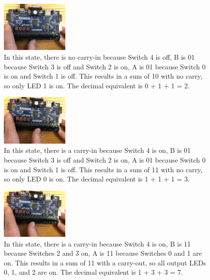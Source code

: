 \documentclass[11pt]{article}
\begin{document}
\begin{figure}[H]
\begin{center}
	\includegraphics[width=0.3\textwidth]{./report-images/Part1/IMG_3034.jpg}
	\caption{\label{fig:SlicerOnePlusOne}In this state, there is no carry-in because Switch 4 is off, B is 01 because Switch 3 is off and Switch 2 is on, A is 01 because Switch 0 is on and Switch 1 is off. This results in a sum of 10 with no carry, so only LED 1 is on. The decimal equivalent is 0 + 1 + 1 = 2.}
\end{center}
\end{figure}

\begin{figure}[H]
\begin{center}
	\includegraphics[width=0.3\textwidth]{./report-images/Part1/IMG_3035.jpg}
	\caption{\label{fig:SlicerOnePlusOnePlusOne}In this state, there is a carry-in because Switch 4 is on, B is 01 because Switch 3 is off and Switch 2 is on, A is 01 because Switch 0 is on and Switch 1 is off. This results in a sum of 11 with no carry, so only LED 0 is on. The decimal equivalent is 1 + 1 + 1 = 3.}
\end{center}
\end{figure}

\begin{figure}[H]
\begin{center}
	\includegraphics[width=0.3\textwidth]{./report-images/Part1/IMG_3036.jpg}
	\caption{\label{fig:SlicerOnePlusTwoPlusTwo}In this state, there is a carry-in because Switch 4 is on, B is 11 because Switches 2 and 3 on, A is 11 because Switches 0 and 1 are on. This results in a sum of 11 with a carry-out, so all output LEDs 0, 1, and 2 are on. The decimal equivalent is 1 + 3 + 3 = 7.}
\end{center}
\end{figure}
\end{document}
